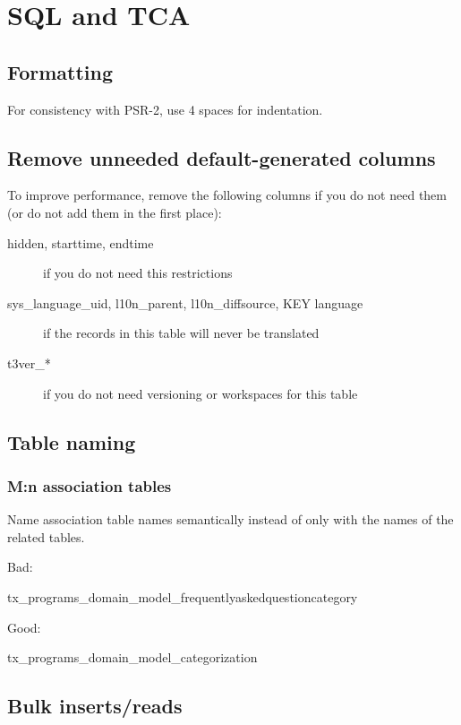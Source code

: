 \chapter{SQL and TCA}

\section{Formatting}
For consistency with PSR-2, use 4 spaces for indentation.

\section{Remove unneeded default-generated columns}

To improve performance, remove the following columns if you do not need them (or do not add them in the first place):

\begin{description}
  \item[hidden, starttime, endtime] if you do not need this restrictions
  \item[sys\_language\_uid, l10n\_parent, l10n\_diffsource, KEY language] if the records in this table will never be translated
  \item[t3ver\_*] if you do not need versioning or workspaces for this table
\end{description}


\section{Table naming}

\subsection{M:n association tables}

Name association table names semantically instead of only with the names of the related tables.

Bad:

\begin{sqlcode}
tx_programs_domain_model_frequentlyaskedquestioncategory
\end{sqlcode}

Good:

\begin{sqlcode}
tx_programs_domain_model_categorization
\end{sqlcode}


\section{Bulk inserts/reads}

